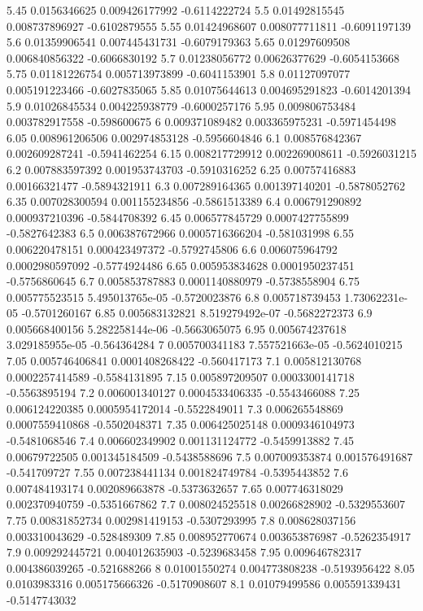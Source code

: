 {5.45 0.0156346625 0.009426177992 -0.6114222724
5.5 0.01492815545 0.008737896927 -0.6102879555
5.55 0.01424968607 0.008077711811 -0.6091197139
5.6 0.01359906541 0.007445431731 -0.6079179363
5.65 0.01297609508 0.006840856322 -0.6066830192
5.7 0.01238056772 0.00626377629 -0.6054153668
5.75 0.01181226754 0.005713973899 -0.6041153901
5.8 0.01127097077 0.005191223466 -0.6027835065
5.85 0.01075644613 0.004695291823 -0.6014201394
5.9 0.01026845534 0.004225938779 -0.6000257176
5.95 0.009806753484 0.003782917558 -0.598600675
6 0.009371089482 0.003365975231 -0.5971454498
6.05 0.008961206506 0.002974853128 -0.5956604846
6.1 0.008576842367 0.002609287241 -0.5941462254
6.15 0.008217729912 0.002269008611 -0.5926031215
6.2 0.007883597392 0.001953743703 -0.5910316252
6.25 0.00757416883 0.00166321477 -0.5894321911
6.3 0.007289164365 0.001397140201 -0.5878052762
6.35 0.007028300594 0.001155234856 -0.5861513389
6.4 0.006791290892 0.000937210396 -0.5844708392
6.45 0.006577845729 0.0007427755899 -0.5827642383
6.5 0.006387672966 0.0005716366204 -0.581031998
6.55 0.006220478151 0.000423497372 -0.5792745806
6.6 0.006075964792 0.0002980597092 -0.5774924486
6.65 0.005953834628 0.0001950237451 -0.5756860645
6.7 0.005853787883 0.0001140880979 -0.5738558904
6.75 0.005775523515 5.495013765e-05 -0.5720023876
6.8 0.005718739453 1.73062231e-05 -0.5701260167
6.85 0.005683132821 8.519279492e-07 -0.5682272373
6.9 0.005668400156 5.282258144e-06 -0.5663065075
6.95 0.005674237618 3.029185955e-05 -0.564364284
7 0.005700341183 7.557521663e-05 -0.5624010215
7.05 0.005746406841 0.0001408268422 -0.560417173
7.1 0.005812130768 0.0002257414589 -0.5584131895
7.15 0.005897209507 0.0003300141718 -0.5563895194
7.2 0.006001340127 0.0004533406335 -0.5543466088
7.25 0.006124220385 0.0005954172014 -0.5522849011
7.3 0.006265548869 0.0007559410868 -0.5502048371
7.35 0.006425025148 0.0009346104973 -0.5481068546
7.4 0.006602349902 0.001131124772 -0.5459913882
7.45 0.00679722505 0.001345184509 -0.5438588696
7.5 0.007009353874 0.001576491687 -0.541709727
7.55 0.007238441134 0.001824749784 -0.5395443852
7.6 0.007484193174 0.002089663878 -0.5373632657
7.65 0.007746318029 0.002370940759 -0.5351667862
7.7 0.008024525518 0.00266828902 -0.5329553607
7.75 0.00831852734 0.002981419153 -0.5307293995
7.8 0.008628037156 0.003310043629 -0.528489309
7.85 0.008952770674 0.003653876987 -0.5262354917
7.9 0.009292445721 0.004012635903 -0.5239683458
7.95 0.009646782317 0.004386039265 -0.521688266
8 0.01001550274 0.004773808238 -0.5193956422
8.05 0.0103983316 0.005175666326 -0.5170908607
8.1 0.01079499586 0.005591339431 -0.5147743032
}
